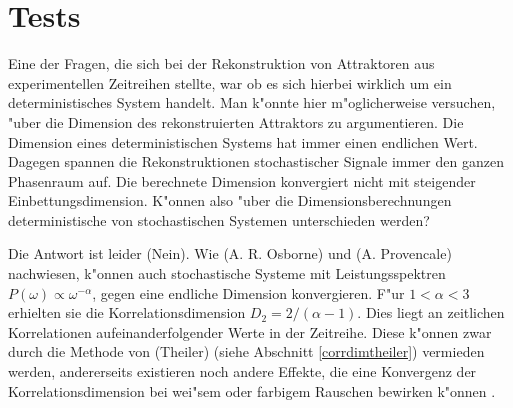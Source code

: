 \clearpage
\section{Tests}
Eine der Fragen, die sich bei der Rekonstruktion von Attraktoren aus experimentellen
Zeitreihen stellte, war ob es sich hierbei wirklich um ein deterministisches System
handelt.  Man k"onnte hier m"oglicherweise versuchen, "uber die Dimension des
rekonstruierten Attraktors zu argumentieren. Die Dimension eines deterministischen
Systems hat immer einen endlichen Wert. Dagegen spannen die Rekonstruktionen
stochastischer Signale immer den ganzen Phasenraum auf. Die berechnete Dimension
konvergiert nicht mit steigender Einbettungsdimension. K"onnen also "uber die
Dimensionsberechnungen deterministische von stochastischen Systemen unterschieden werden?

Die Antwort ist leider \naja(Nein). Wie \autor(A. R. Osborne) und \autor(A. Provencale)
nachwiesen, k"onnen auch stochastische Systeme mit Leistungsspektren
$P(\omega)\propto\omega^{-\alpha}$, gegen eine endliche Dimension
konvergieren\cite{Osborne89a}. F"ur $1<\alpha<3$ erhielten sie die Korrelationsdimension $D_2=2/(\alpha-1)$.  Dies
liegt an zeitlichen Korrelationen aufeinanderfolgender Werte in der Zeitreihe. Diese
k"onnen zwar durch die Methode von \autor(Theiler) (siehe Abschnitt \ref{corrdimtheiler})
vermieden werden, andererseits existieren noch andere Effekte, die eine Konvergenz der
Korrelationsdimension bei wei"sem oder farbigem Rauschen bewirken k"onnen \cite{Kennel92b}.


